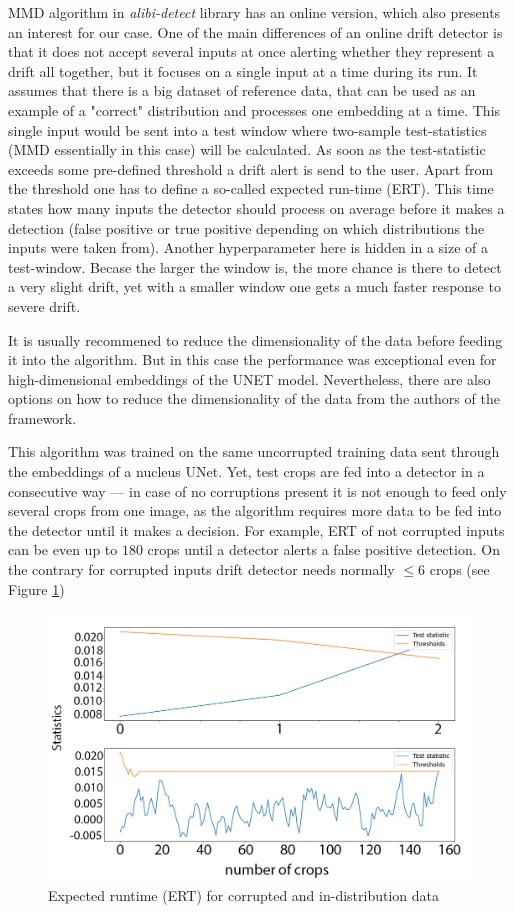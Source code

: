 MMD algorithm in \textit{alibi-detect} library has an online version, which also presents an interest for our case. One of the main differences of an online drift detector is that it does not accept several inputs at once alerting whether they represent a drift all together, but it focuses on a single input at a time during its run. It assumes that there is a big dataset of reference data, that can be used as an example of a "correct" distribution and processes one embedding at a time. This single input would be sent into a test window where two-sample test-statistics (MMD essentially in this case) will be calculated. As soon as the test-statistic exceeds some pre-defined threshold a drift alert is send to the user. Apart from the threshold one has to define a so-called expected run-time (ERT). This time states how many inputs the detector should process on average before it makes a detection (false positive or true positive depending on which distributions the inputs were taken from). Another hyperparameter here is hidden in a size of a test-window. Becase the larger the window is, the more chance is there to detect a very slight drift, yet with a smaller window one gets a much faster response to severe drift. 

It is usually recommened to reduce the dimensionality of the data before feeding it into the algorithm. But in this case the performance was exceptional even for high-dimensional embeddings of the UNET model. Nevertheless, there are also options on how to reduce the dimensionality of the data from the authors of the framework.

This algorithm was trained on the same uncorrupted training data sent through the embeddings of a nucleus UNet. Yet, test crops are fed into a detector in a consecutive way --- in case of no corruptions present it is not enough to feed only several crops from one image, as the algorithm requires more data to be fed into the detector until it makes a decision. For example, ERT of not corrupted inputs can be even up to $180$ crops until a detector alerts a false positive detection. On the contrary for corrupted inputs drift detector needs normally $\leq 6$ crops (see Figure \ref{fig:online-ert})
\begin{figure}[htb]
	\begin{center}
		\includegraphics[width=0.6\linewidth]{bilder/drift-detection/online.png}
		\caption{Expected runtime (ERT) for corrupted and in-distribution data}\label{fig:online-ert}
	\end{center}
\end{figure}

